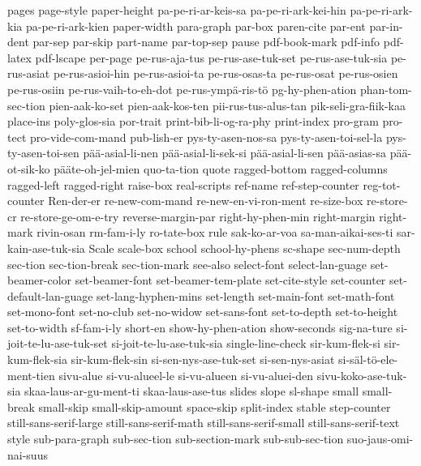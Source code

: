 {  pages
  page-style
  paper-height
  pa-pe-ri-ar-keis-sa
  pa-pe-ri-ark-kei-hin
  pa-pe-ri-ark-kia
  pa-pe-ri-ark-kien
  paper-width
  para-graph
  par-box
  paren-cite
  par-ent
  par-in-dent
  par-sep
  par-skip
  part-name
  par-top-sep
  pause
  pdf-book-mark
  pdf-info
  pdf-latex
  pdf-lscape
  per-page
  pe-rus-aja-tus
  pe-rus-ase-tuk-set
  pe-rus-ase-tuk-sia
  pe-rus-asiat
  pe-rus-asioi-hin
  pe-rus-asioi-ta
  pe-rus-osas-ta
  pe-rus-osat
  pe-rus-osien
  pe-rus-osiin
  pe-rus-vaih-to-eh-dot
  pe-rus-ympä-ris-tö
  pg-hy-phen-ation
  phan-tom-sec-tion
  pien-aak-ko-set
  pien-aak-kos-ten
  pii-rus-tus-alus-tan
  pik-seli-gra-fiik-kaa
  place-ins
  poly-glos-sia
  por-trait
  print-bib-li-og-ra-phy
  print-index
  pro-gram
  pro-tect
  pro-vide-com-mand
  pub-lish-er
  pys-ty-asen-nos-sa
  pys-ty-asen-toi-sel-la
  pys-ty-asen-toi-sen
  pää-asial-li-nen
  pää-asial-li-sek-si
  pää-asial-li-sen
  pää-asias-sa
  pää-ot-sik-ko
  pääte-oh-jel-mien
  quo-ta-tion
  quote
  ragged-bottom
  ragged-columns
  ragged-left
  ragged-right
  raise-box
  real-scripts
  ref-name
  ref-step-counter
  reg-tot-counter
  Ren-der-er
  re-new-com-mand
  re-new-en-vi-ron-ment
  re-size-box
  re-store-cr
  re-store-ge-om-e-try
  reverse-margin-par
  right-hy-phen-min
  right-margin
  right-mark
  rivin-osan
  rm-fam-i-ly
  ro-tate-box
  rule
  sak-ko-ar-voa
  sa-man-aikai-ses-ti
  sar-kain-ase-tuk-sia
  Scale
  scale-box
  school
  school-hy-phens
  sc-shape
  sec-num-depth
  sec-tion
  sec-tion-break
  sec-tion-mark
  see-also
  select-font
  select-lan-guage
  set-beamer-color
  set-beamer-font
  set-beamer-tem-plate
  set-cite-style
  set-counter
  set-default-lan-guage
  set-lang-hyphen-mins
  set-length
  set-main-font
  set-math-font
  set-mono-font
  set-no-club
  set-no-widow
  set-sans-font
  set-to-depth
  set-to-height
  set-to-width
  sf-fam-i-ly
  short-en
  show-hy-phen-ation
  show-seconds
  sig-na-ture
  si-joit-te-lu-ase-tuk-set
  si-joit-te-lu-ase-tuk-sia
  single-line-check
  sir-kum-flek-si
  sir-kum-flek-sia
  sir-kum-flek-sin
  si-sen-nys-ase-tuk-set
  si-sen-nys-asiat
  si-säl-tö-ele-ment-tien
  sivu-alue
  si-vu-alueel-le
  si-vu-alueen
  si-vu-aluei-den
  sivu-koko-ase-tuk-sia
  skaa-laus-ar-gu-ment-ti
  skaa-laus-ase-tus
  slides
  slope
  sl-shape
  small
  small-break
  small-skip
  small-skip-amount
  space-skip
  split-index
  stable
  step-counter
  still-sans-serif-large
  still-sans-serif-math
  still-sans-serif-small
  still-sans-serif-text
  style
  sub-para-graph
  sub-sec-tion
  sub-section-mark
  sub-sub-sec-tion
  suo-jaus-omi-nai-suus
}
